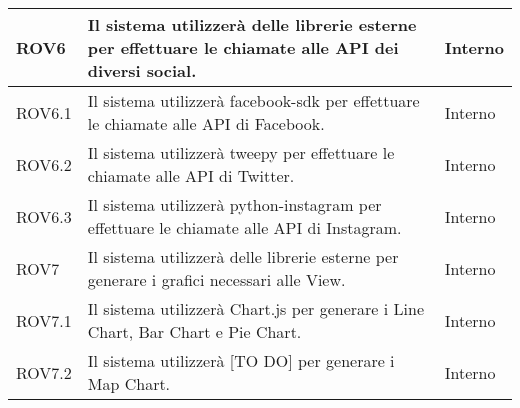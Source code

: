 \begin{center}
\begin{longtable}{| p{2cm} | p{8cm} | p{2cm} |}
		ROV6  &  Il sistema utilizzerà delle librerie esterne per effettuare le chiamate alle API dei diversi social.  &  Interno \\
		\hline
		ROV6.1  &  Il sistema utilizzerà facebook-sdk per effettuare le chiamate alle API di Facebook.  &  Interno \\
		\hline
		ROV6.2  &  Il sistema utilizzerà tweepy per effettuare le chiamate alle API di Twitter.  &  Interno \\
		\hline
		ROV6.3  &  Il sistema utilizzerà python-instagram per effettuare le chiamate alle API di Instagram.  &  Interno \\
		\hline

		ROV7  &  Il sistema utilizzerà delle librerie esterne per generare i grafici necessari alle View.  &  Interno \\
		\hline
		ROV7.1  &  Il sistema utilizzerà Chart.js per generare i Line Chart, Bar Chart e Pie Chart.  &  Interno \\
		\hline
		ROV7.2  &  Il sistema utilizzerà [TO DO] per generare i Map Chart.  &  Interno \\
		\hline

	\end{longtable}
	\egroup
\end{center}

